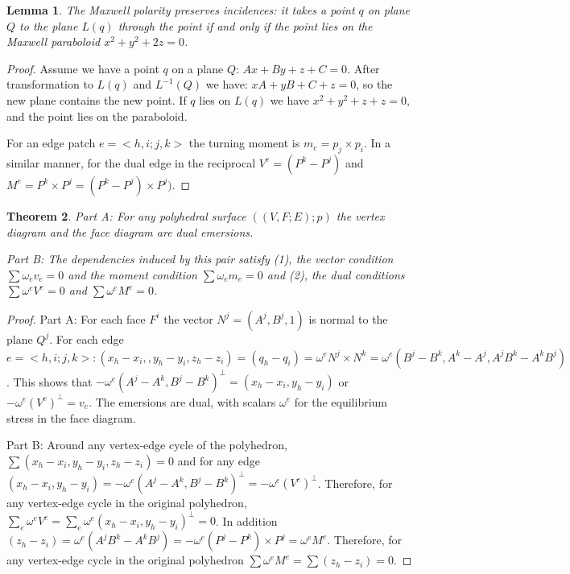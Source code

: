 \documentclass[11pt]{article}
\newtheorem{theorem}{Theorem}[section]
\newtheorem{lemma}[theorem]{Lemma}
\theoremstyle{definition}
\begin{document}
	\begin{lemma}
		The Maxwell polarity preserves incidences: it takes a point $q$ on plane $Q$ to the plane $L(q)$ through the point if and only if the point lies on the Maxwell paraboloid $x^2 + y^2 + 2z = 0$.
 	\end{lemma}
	
	\begin{proof}
		Assume we have a point $q$ on a plane $Q$: $Ax + By + z + C = 0$. 
		After transformation to $L(q)$ and $L^{-1}(Q)$ we have: $xA + yB + C + z = 0$, so the new plane contains the new point. 
		If $q$ lies on $L(q)$ we have $x^2 + y^2 + z + z = 0$, and the point lies on the paraboloid. 
 
 		For an edge patch $e = <h,i;j,k>$ the turning moment is $m_e = p_j \times p_i$. 
		In a similar manner, for the dual edge in the reciprocal $V^e = (P^k - P^j)$ and $M^e = P^k \times P^j = (P^k - P^j)\times P^j)$.
	\end{proof}
 
	\begin{theorem}
		Part A: For any polyhedral surface $((V,F;E);p)$ the vertex diagram and the face diagram are dual emersions.
		
 		Part B: The dependencies induced by this pair satisfy 
		(1), the vector condition $\sum \omega_e v_e = 0$ and the moment condition $\sum \omega_e m_e = 0$ and 
		(2), the dual conditions $\sum \omega^e V^e = 0$ and $\sum \omega^e M^e = 0$.
	\end{theorem}
 
 	\begin{proof}
		Part A: 
		For each face $F^i$ the vector $N^j = (A^j, B^j,1)$ is normal to the plane $Q^j$. 
		For each edge $e = <h,i;j,k>:  (x_h-x_i,,y_h-y_i, z_h-z_i)=(q_h-q_i) = \omega^e N^j \times N^k = \omega^e(B^j-B^k,A^k-A^j,A^jB^k-A^kB^j)$. 
		This shows that $-\omega^e(A^j-A^k,B^j-B^k)^\bot = (x_h - x_i, y_h-y_i)$ or $-\omega^e(V^e)^\bot = v_e$. 
		The emersions are dual, with scalars $\omega^e$ for the equilibrium stress in the face diagram.
 
 		Part B: 
		Around any vertex-edge cycle of the polyhedron, $\sum(x_h - x_i, y_h-y_i, z_h-z_i) = 0$ and for any edge $(x_h-x_i,y_h-y_i) = -\omega^e(A^j-A^k,B^j-B^k)^\bot = -\omega^e(V^e)^\bot$. 
		Therefore, for any vertex-edge cycle in the original polyhedron, $\sum_e \omega^eV^e = \sum_e \omega^e(x_h-x_i,y_h-y_i)^\bot = 0$. 
		In addition $(z_h-z_i) = \omega^e(A^jB^k-A^kB^j) = -\omega^e(P^j-P^k) \times P^j = \omega^eM^e$. 
		Therefore, for any vertex-edge cycle in the original polyhedron $\sum \omega^eM^e = \sum(z_h-z_i) = 0$. 
 	\end{proof}
	
\end{document}
